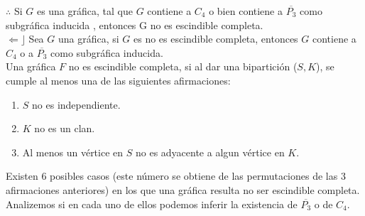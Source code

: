 \documentclass[12pt]{article}
\begin{document}
$\therefore$ Si $G$ es una gráfica, tal que $G$ contiene a $C_4$ o bien contiene a $\overline{P_3}$ como subgráfica inducida , entonces G no es escindible completa.\\

$\Leftarrow \rfloor$ Sea $G$ una gráfica, si $G$ es no es escindible completa, entonces $G$ contiene a $C_4$ o a $\overline{P_3}$ como subgráfica inducida.\\

Una gráfica $F$ no es escindible completa, si al dar una bipartición ($S,K$), se cumple al menos una de las siguientes afirmaciones:\\

\begin{enumerate}
	\item $S$ no es independiente.
	\item $K$ no es un clan.
	\item Al menos un vértice en $S$ no es adyacente a algun vértice en $K$.
\end{enumerate}

Existen 6 posibles casos (este número se obtiene de las permutaciones de las 3 afirmaciones anteriores) en los que una gráfica resulta no ser escindible completa. Analizemos si en cada uno de ellos podemos inferir la existencia de $\overline{P_3}$ o de $C_4$.\\
\end{document}
